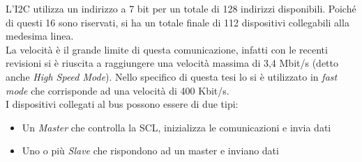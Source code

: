L'I2C utilizza un indirizzo a 7 bit per un totale di 128 indirizzi disponibili. Poiché di questi 16 sono riservati, si ha un totale finale di 112 dispositivi collegabili alla medesima linea.\\
La velocità è il grande limite di questa comunicazione, infatti con le recenti revisioni si è riuscita a raggiungere una velocità massima di 3,4 Mbit/s (detto anche \textit{High Speed Mode}). Nello specifico di questa tesi lo si è utilizzato in \textit{fast mode} che corrisponde ad una velocità di 400 Kbit/s.\\
I dispositivi collegati al bus possono essere di due tipi:
\begin{itemize}
\item Un \textit{Master} che controlla la SCL, inizializza le comunicazioni e invia dati
\item Uno o più \textit{Slave} che rispondono ad un master e inviano dati
\end{itemize}

